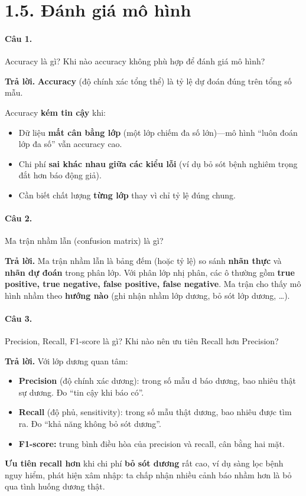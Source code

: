 \section*{1.5. Đánh giá mô hình}

\paragraph{Câu 1.} Accuracy là gì? Khi nào accuracy không phù hợp để đánh giá mô hình?

\medskip\noindent\textbf{Trả lời.} \textbf{Accuracy} (độ chính xác tổng thể) là tỷ lệ dự đoán đúng trên tổng số mẫu.

Accuracy \textbf{kém tin cậy} khi:
\begin{itemize}[nosep]
\item Dữ liệu \textbf{mất cân bằng lớp} (một lớp chiếm đa số lớn)---mô hình ``luôn đoán lớp đa số'' vẫn accuracy cao.
\item Chi phí \textbf{sai khác nhau giữa các kiểu lỗi} (ví dụ bỏ sót bệnh nghiêm trọng đắt hơn báo động giả).
\item Cần biết chất lượng \textbf{từng lớp} thay vì chỉ tỷ lệ đúng chung.
\end{itemize}

\paragraph{Câu 2.} Ma trận nhầm lẫn (confusion matrix) là gì?

\medskip\noindent\textbf{Trả lời.} Ma trận nhầm lẫn là bảng đếm (hoặc tỷ lệ) so sánh \textbf{nhãn thực} và \textbf{nhãn dự đoán} trong phân lớp. Với phân lớp nhị phân, các ô thường gồm \textbf{true positive, true negative, false positive, false negative}. Ma trận cho thấy mô hình nhầm theo \textbf{hướng nào} (ghi nhận nhầm lớp dương, bỏ sót lớp dương, \ldots).

\paragraph{Câu 3.} Precision, Recall, F1-score là gì? Khi nào nên ưu tiên Recall hơn Precision?

\medskip\noindent\textbf{Trả lời.} Với lớp dương quan tâm:
\begin{itemize}[nosep]
\item \textbf{Precision} (độ chính xác dương): trong số mẫu d báo dương, bao nhiêu thật sự dương. Đo ``tin cậy khi báo có''.
\item \textbf{Recall} (độ phủ, sensitivity): trong số mẫu thật dương, bao nhiêu được tìm ra. Đo ``khả năng không bỏ sót dương''.
\item \textbf{F1-score:} trung bình điều hòa của precision và recall, cân bằng hai mặt.
\end{itemize}
\textbf{Ưu tiên recall hơn} khi chi phí \textbf{bỏ sót dương} rất cao, ví dụ sàng lọc bệnh nguy hiểm, phát hiện xâm nhập: ta chấp nhận nhiều cảnh báo nhầm hơn là bỏ qua tình huống dương thật.

